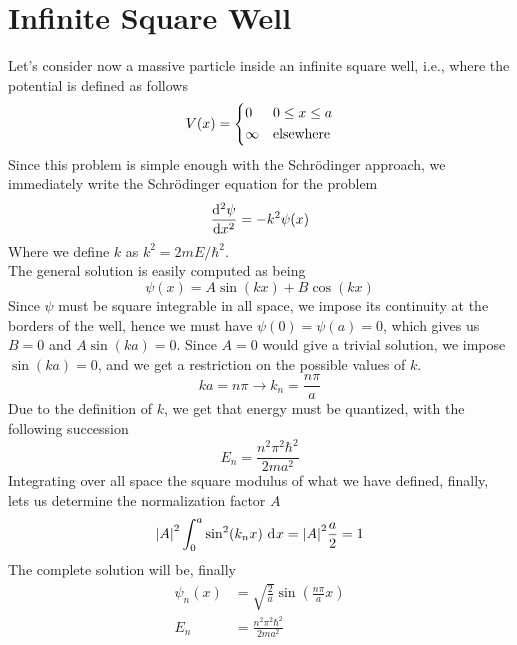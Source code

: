 \documentclass[../qm.tex]{subfiles}
\begin{document}
	\section{Infinite Square Well}
	Let's consider now a massive particle inside an infinite square well, i.e., where the potential is defined as follows
	\begin{equation*}
		V(x)=\begin{dcases}
			0&0\le x\le a\\
			\infty&\text{elsewhere}
		\end{dcases}
	\end{equation*}
	Since this problem is simple enough with the Schrödinger approach, we immediately write the Schrödinger equation for the problem
	\begin{equation}
		\derivative[2]{\psi}{x}=-k^2\psi(x)
		\label{eq:infsqwellsch}
	\end{equation}
	Where we define $k$ as $k^2=2mE/\hbar^2$.\\
	The general solution is easily computed as being
	\begin{equation}
		\psi(x)=A\sin(kx)+B\cos(kx)
		\label{eq:gensolinfsqw}
	\end{equation}
	Since $\psi$ must be square integrable in all space, we impose its continuity at the borders of the well, hence we must have $\psi(0)=\psi(a)=0$, which gives us $B=0$ and $A\sin(ka)=0$. Since $A=0$ would give a trivial solution, we impose $\sin(ka)=0$, and we get a restriction on the possible values of $k$.
	\begin{equation}
		ka=n\pi\longrightarrow k_n=\frac{n\pi}{a}
		\label{eq:kconstrinfsq}
	\end{equation}
	Due to the definition of $k$, we get that energy must be quantized, with the following succession
	\begin{equation}
		E_n=\frac{n^2\pi^2\hbar^2}{2ma^2}
		\label{eq:infsqenquant}
	\end{equation}
	Integrating over all space the square modulus of what we have defined, finally, lets us determine the normalization factor $A$
	\begin{equation}
		\abs{A}^2\int_{0}^{a}\sin^2(k_nx)\ \mathrm{d}^{}x=\abs{A}^2\frac{a}{2}=1
		\label{eq:norm}
	\end{equation}
	The complete solution will be, finally
	\begin{equation}
		\begin{aligned}
			\psi_n(x)&=\sqrt{\frac{2}{a}}\sin\left( \frac{n\pi}{a}x \right)\\
			E_n&=\frac{n^2\pi^2\hbar^2}{2ma^2}
		\end{aligned}
		\label{eq:infsqwellsol}
	\end{equation}
\end{document}
